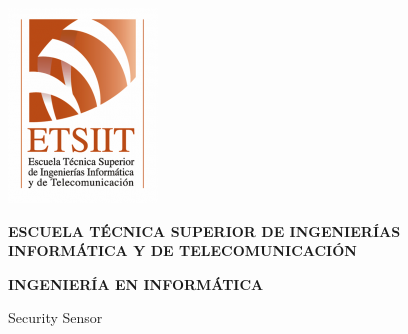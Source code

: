 \pagestyle{empty}
\begin{titlepage}

  \begin{center}

    \includegraphics[scale=.5]{logo_ugr.png} \\

    \vspace{2.0cm}

    \LARGE{\textbf{ESCUELA TÉCNICA SUPERIOR DE INGENIERÍAS INFORMÁTICA Y DE TELECOMUNICACIÓN}} \\
      
    \vspace{1.0cm}

    \Large{\textbf{INGENIERÍA EN INFORMÁTICA}} \\

    \vspace{3.0cm}

    \Large{Security Sensor}

  \end{center}
\end{titlepage}
